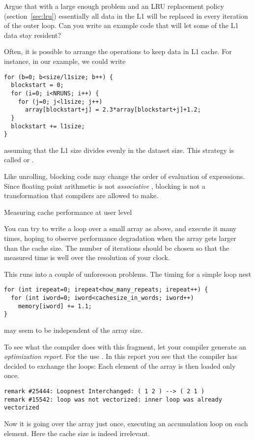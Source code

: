 \begin{exercise}
  Argue that with a large enough problem and an \ac{LRU} replacement policy
  (section~\ref{sec:lru}) essentially all data in the L1 will be
  replaced in every iteration of the outer loop. Can you write an
  example code that will let some of the L1 data stay resident?
\end{exercise}

Often, it is possible to arrange the operations to keep data in L1
cache. For instance, in our example, we could write
\begin{verbatim}
for (b=0; b<size/l1size; b++) {
  blockstart = 0;
  for (i=0; i<NRUNS; i++) {
    for (j=0; j<l1size; j++)
      array[blockstart+j] = 2.3*array[blockstart+j]+1.2; 
  }
  blockstart += l1size;
}
\end{verbatim}
assuming that the L1 size divides evenly in the dataset size.
This strategy is called  or
.

\begin{remark}
  Like unrolling, blocking code may change the order of evaluation of
  expressions. Since floating point arithmetic is not
  \emph{associative}%
  ,
  blocking is not a transformation that compilers are allowed to make.
\end{remark}

 {Measuring cache performance at user level}

You can try to write a loop over a small array as above, and
execute it many times,
hoping to observe performance degradation when the
array gets larger than the cache size.
The number of iterations should be chosen so that the measured time
is well over the resolution of your clock.

This runs into a couple of unforesoon problems.
The timing for a simple loop nest
\begin{lstlisting}
for (int irepeat=0; irepeat<how_many_repeats; irepeat++) {
  for (int iword=0; iword<cachesize_in_words; iword++)
    memory[iword] += 1.1;
}    
\end{lstlisting}
may seem to be independent of the array size.

To see what the compiler does with this fragment,
let your compiler generate an
\emph{optimization report}.
For the  use .
In this report you see that the compiler has decided to exchange the loops:
Each element of the array is then loaded only once.
\begin{verbatim}
remark #25444: Loopnest Interchanged: ( 1 2 ) --> ( 2 1 )
remark #15542: loop was not vectorized: inner loop was already vectorized
\end{verbatim}
Now it is going over the array just once, executing an accumulation loop
on each element. Here the cache size is indeed irrelevant.

